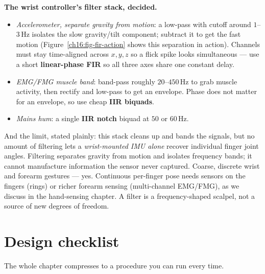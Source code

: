 \begin{goalbox}
\textbf{The wrist controller's filter stack, decided.}
\begin{itemize}
\item \emph{Accelerometer, separate gravity from motion}: a low-pass with cutoff
around $1$--$3$\,Hz isolates the slow gravity/tilt component; subtract it to get
the fast motion (Figure~\ref{ch16:fig-fir-action} shows this separation in
action). Channels must stay time-aligned across $x,y,z$ so a flick spike
looks simultaneous --- use a short \textbf{linear-phase FIR} so all three axes
share one constant delay.
\item \emph{EMG/FMG muscle band}: band-pass roughly $20$--$450$\,Hz to grab muscle
activity, then rectify and low-pass to get an envelope. Phase does not matter for
an envelope, so use cheap \textbf{IIR biquads}.
\item \emph{Mains hum}: a single \textbf{IIR notch} biquad at $50$ or $60$\,Hz.
\end{itemize}
And the limit, stated plainly: this stack cleans up and bands the signals,
but no amount of filtering lets a \emph{wrist-mounted IMU alone} recover individual
finger joint angles. Filtering separates gravity from motion and isolates frequency
bands; it cannot manufacture information the sensor never captured. Coarse,
discrete wrist and forearm gestures --- yes. Continuous per-finger pose needs
sensors on the fingers (rings) or richer forearm sensing (multi-channel EMG/FMG),
as we discuss in the hand-sensing chapter. A filter is a frequency-shaped scalpel,
not a source of new degrees of freedom.
\end{goalbox}

\section{Design checklist}
\label{ch16:checklist}

The whole chapter compresses to a procedure you can run every time.


